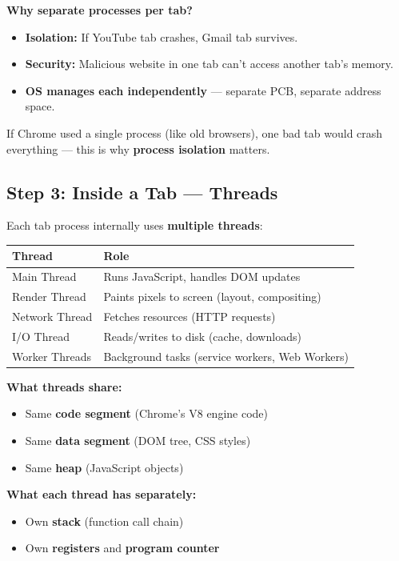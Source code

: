 \documentclass[12pt,a4paper]{article}
\begin{document}
\textbf{Why separate processes per tab?}
\begin{itemize}[leftmargin=*]
    \item \textbf{Isolation:} If YouTube tab crashes, Gmail tab survives.
    \item \textbf{Security:} Malicious website in one tab can't access another tab's memory.
    \item \textbf{OS manages each independently} --- separate PCB, separate address space.
\end{itemize}

If Chrome used a single process (like old browsers), one bad tab would crash everything --- this is why \textbf{process isolation} matters.

\subsection{Step 3: Inside a Tab --- Threads}

Each tab process internally uses \textbf{multiple threads}:

\begin{center}
\begin{tabular}{@{} l p{8cm} @{}}
\toprule
\textbf{Thread} & \textbf{Role} \\
\midrule
Main Thread & Runs JavaScript, handles DOM updates \\
Render Thread & Paints pixels to screen (layout, compositing) \\
Network Thread & Fetches resources (HTTP requests) \\
I/O Thread & Reads/writes to disk (cache, downloads) \\
Worker Threads & Background tasks (service workers, Web Workers) \\
\bottomrule
\end{tabular}
\end{center}

\textbf{What threads share:}
\begin{itemize}[leftmargin=*]
    \item Same \textbf{code segment} (Chrome's V8 engine code)
    \item Same \textbf{data segment} (DOM tree, CSS styles)
    \item Same \textbf{heap} (JavaScript objects)
\end{itemize}

\textbf{What each thread has separately:}
\begin{itemize}[leftmargin=*]
    \item Own \textbf{stack} (function call chain)
    \item Own \textbf{registers} and \textbf{program counter}
\end{itemize}
\end{document}
